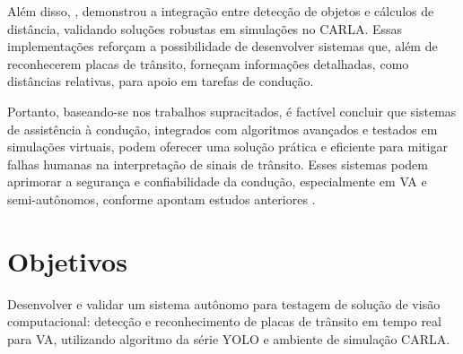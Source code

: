 \documentclass[
	12pt,				%
	oneside, %
	a4paper,			%
	english,			%
	french,				%
	spanish,			%
	brazil				%
	]{abntex2}
\begin{document}
Além disso, , demonstrou a integração entre detecção de objetos e cálculos de distância, validando soluções robustas em simulações no CARLA. Essas implementações reforçam a possibilidade de desenvolver sistemas que, além de reconhecerem placas de trânsito, forneçam informações detalhadas, como distâncias relativas, para apoio em tarefas de condução.

Portanto, baseando-se nos trabalhos supracitados, é factível concluir que sistemas de assistência à condução, integrados com algoritmos avançados e testados em simulações virtuais, podem oferecer uma solução prática e eficiente para mitigar falhas humanas na interpretação de sinais de trânsito. Esses sistemas podem aprimorar a segurança e confiabilidade da condução, especialmente em VA e semi-autônomos, conforme apontam estudos anteriores \cite{ahire2024simulating, sensors-yet}.

\section{Objetivos} \label{objetivos}

Desenvolver e validar um sistema autônomo para testagem de solução de visão computacional: detecção e reconhecimento de placas de trânsito em tempo real para VA, utilizando algoritmo da série YOLO e ambiente de simulação CARLA.
\end{document}
